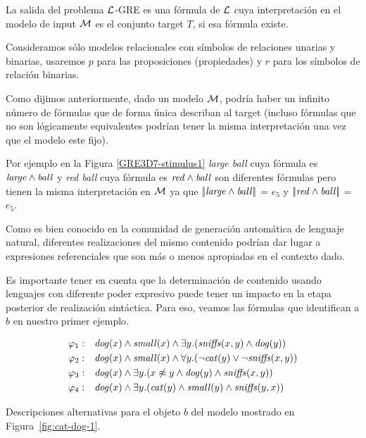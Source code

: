 La salida del problema $\mathcal{L}$-GRE es una f\'ormula de
$\mathcal{L}$ cuya interpretaci\'on en el modelo de input $\mathcal{M}$ es el conjunto target $T$, si
esa f\'ormula existe. 

Consideramos s\'olo modelos relacionales con s\'imbolos de relaciones unarias y binarias, usaremos $p$ para las proposiciones (propiedades) y $r$ para los s\'imbolos de relaci\'on binarias.

Como dijimos anteriormente, dado un modelo $\mathcal{M}$, podr\'ia haber un infinito n\'umero de f\'ormulas que de forma \'unica
describan al target (incluso f\'ormulas que no son l\'ogicamente equivalentes podr\'ian tener
la misma interpretaci\'on una vez que el modelo este fijo). 

Por ejemplo en la Figura \ref{GRE3D7-stimulus1} {\it large ball} cuya f\'ormula es $\mathit{large} \land \mathit{ball}$ y {\it red ball} cuya f\'ormula es $\mathit{red} \land \mathit{ball}$ son diferentes f\'ormulas pero tienen la misma interpretaci\'on en $\mathcal{M}$ ya que $|\!|\mathit{large} \land \mathit{ball}|\!|$ = $e_5$ y $|\!|\mathit{red} \land \mathit{ball}|\!|$ = $e_5$.

Como es bien conocido en la comunidad de generaci\'on autom\'atica de lenguaje natural, diferentes
realizaciones del mismo contenido podr\'ian dar lugar a expresiones referenciales que son m\'as o menos
apropiadas en el contexto dado. 

Es importante tener en cuenta que la determinaci\'on de contenido usando lenguajes con diferente poder expresivo puede tener un impacto en la etapa posterior de realizaci\'on sint\'actica. Para eso, veamos las f\'ormulas que identifican a $b$ en nuestro primer ejemplo.

\begin{table}[h]
$$
\begin{array}{cl}
 \varphi_1: & \mathit{dog}(x) \land \mathit{small}(x) \land
   \exists y . (\mathit{sniffs}(x,y) \land \mathit{dog}(y))\\[3pt]
  \varphi_2: & \mathit{dog}(x) \land \mathit{small}(x) \land
  \forall y . (\neg \mathit{cat}(y) \lor \neg \mathit{sniffs}(x,y))\\[3pt]
  \varphi_3: & \mathit{dog}(x) \land
  \exists y . (x \not\approx y \land \mathit{dog}(y)  \land \mathit{sniffs}(x,y))\\[3pt]
  \varphi_4: & \mathit{dog}(x) \land
  \exists y . (\mathit{cat}(y) \land \mathit{small}(y) \land \mathit{sniffs}(y,x))
 \end{array}
$$
\caption{Descripciones alternativas para el objeto $b$ del modelo mostrado en Figura~\ref{fig:cat-dog-1}.}\label{tab:gammas}
\end{table}

